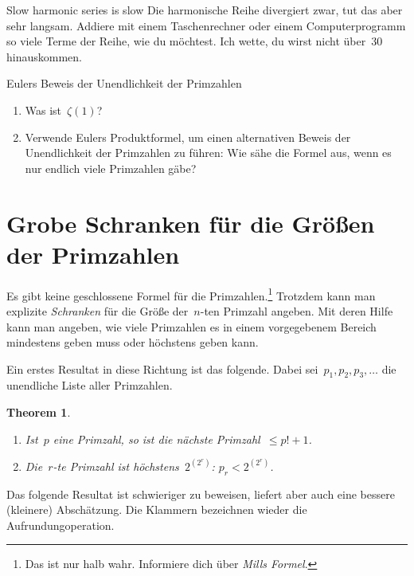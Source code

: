 \documentclass[twoside]{../zirkelblatt1415}
\theoremstyle{definition}
\theoremstyle{plain}
\newtheorem{thm}[defn]{Theorem}
\theoremstyle{remark}
\begin{document}
\begin{aufgabe}{Slow harmonic series is slow}
Die harmonische Reihe divergiert zwar, tut das aber sehr langsam. Addiere mit
einem Taschenrechner oder einem Computerprogramm so viele Terme der Reihe, wie
du möchtest. Ich wette, du wirst nicht über~$30$ hinauskommen.
\end{aufgabe}

\begin{aufgabe}{Eulers Beweis der Unendlichkeit der Primzahlen}
\begin{enumerate}
\item Was ist~$\zeta(1)$?
\item Verwende Eulers Produktformel, um einen alternativen Beweis der
Unendlichkeit der Primzahlen zu führen: Wie sähe die Formel aus, wenn es nur
endlich viele Primzahlen gäbe?
\end{enumerate}\fixlistspacing
\end{aufgabe}


\section{Grobe Schranken für die Größen der Primzahlen}

Es gibt keine geschlossene Formel für die Primzahlen.\footnote{Das ist nur halb
wahr. Informiere dich über \emph{Mills Formel}.} Trotzdem kann man explizite
\emph{Schranken} für die Größe der~$n$-ten Primzahl angeben. Mit deren Hilfe
kann man angeben, wie viele Primzahlen es in einem vorgegebenem Bereich
mindestens geben muss oder höchstens geben kann.

Ein erstes Resultat in diese Richtung ist das folgende. Dabei
sei~$p_1,p_2,p_3,\ldots$ die unendliche Liste aller Primzahlen.

\begin{thm}\label{thm:schranke1}\ \\[-2em]
\begin{enumerate}
\item
Ist~$p$ eine Primzahl, so ist die nächste Primzahl~$\leq p! + 1$. \\[-2em]
\item
Die~$r$-te Primzahl ist höchstens~$2^{(2^r)}$: $p_r < 2^{(2^r)}$.
\end{enumerate}
\end{thm}

Das folgende Resultat ist schwieriger zu beweisen, liefert aber auch eine
bessere (kleinere) Abschätzung. Die Klammern bezeichnen wieder die
Aufrundungoperation.
\end{document}
